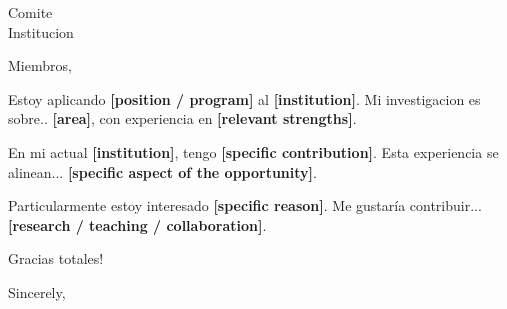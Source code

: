 \documentclass[11pt]{letter}
\newif\ifotherlang
\begin{document}
\ifotherlang
\begin{letter}{Selection Committee\\Department or Institution}
\opening{Dear Members of the Selection Committee,}
I am writing to apply for the \textbf{[position / program]} at \textbf{[institution]}.
My research focuses on \textbf{[area]}, with experience in \textbf{[relevant strengths]}.

In my current/recent role at \textbf{[institution]}, I have \textbf{[specific contribution]}.
This experience aligns with \textbf{[specific aspect of the opportunity]}.

I am particularly interested because \textbf{[specific reason]}. I would welcome the opportunity
to contribute through \textbf{[research / teaching / collaboration]}.

Thank you for considering my application.
\closing{Sincerely,}
\end{letter}

\else
\begin{letter}{Comite\\Institucion}
\opening{Miembros,}
Estoy aplicando \textbf{[position / program]} al \textbf{[institution]}.
Mi investigacion es sobre.. \textbf{[area]}, con experiencia en \textbf{[relevant strengths]}.

En mi actual \textbf{[institution]}, tengo \textbf{[specific contribution]}.
Esta experiencia se alinean... \textbf{[specific aspect of the opportunity]}.

Particularmente estoy interesado \textbf{[specific reason]}. Me gustaría contribuir... \textbf{[research / teaching / collaboration]}.

Gracias totales!
\closing{Sincerely,}
\end{letter}
\fi
\end{document}
